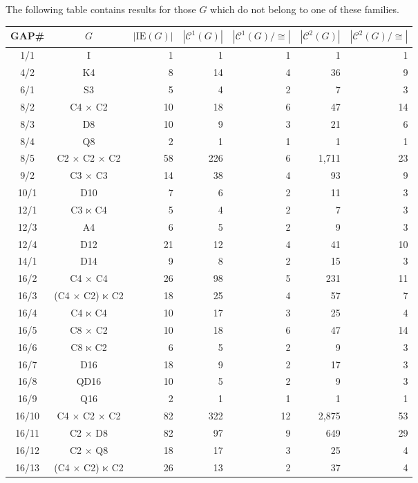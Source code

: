 \documentclass[a4paper,11pt]{article}
\theoremstyle{plain}
\theoremstyle{definition}
\begin{document}
The following table contains results for those $G$ which do not belong 
to one of these families. 
\begin{longtable}{ccrrrrr}
	\hline\hline
	{\textsf{GAP}}\# 
	    & $G$ 
	        & $|\mathrm{IE}(G)|$ 
	            & $|\mathcal{C}^1(G)|$ 
	                & $|\mathcal{C}^1(G)/\cong |$ 
	                    & $|\mathcal{C}^{2}(G)|$ 
	                        & $|\mathcal{C}^{2}(G)/\cong |$  \\ 
	\hline
	1/1 & I & 1 & 1 & 1 & 1 & 1 \\ 
	4/2 & K4 & 8 & 14 & 4 & 36 & 9 \\ 
	6/1 & S3 & 5 & 4 & 2 & 7 & 3 \\ 
	8/2 & C4 $\times$ C2 & 10 & 18 & 6 & 47 & 14 \\ 
	8/3 & D8 & 10 & 9 & 3 & 21 & 6 \\ 
	8/4 & Q8 & 2 & 1 & 1 & 1 & 1 \\ 
	8/5 & C2 $\times$ C2 $\times$ C2 & 58 & 226 & 6 & 1,711 & 23 \\ 
	9/2 & C3 $\times$ C3 & 14 & 38 & 4 & 93 & 9 \\ 
	10/1 & D10 & 7 & 6 & 2 & 11 & 3 \\ 
	12/1 & C3 $\ltimes$ C4 & 5 & 4 & 2 & 7 & 3 \\ 
	12/3 & A4 & 6 & 5 & 2 & 9 & 3 \\ 
	12/4 & D12 & 21 & 12 & 4 & 41 & 10 \\ 
	14/1 & D14 & 9 & 8 & 2 & 15 & 3 \\ 
	16/2 & C4 $\times$ C4 & 26 & 98 & 5 & 231 & 11 \\ 
	16/3 & (C4 $\times$ C2) $\ltimes$ C2 & 18 & 25 & 4 & 57 & 7 \\ 
	16/4 & C4 $\ltimes$ C4 & 10 & 17 & 3 & 25 & 4 \\ 
	16/5 & C8 $\times$ C2 & 10 & 18 & 6 & 47 & 14 \\ 
	16/6 & C8 $\ltimes$ C2 & 6 & 5 & 2 & 9 & 3 \\ 
	16/7 & D16 & 18 & 9 & 2 & 17 & 3 \\ 
	16/8 & QD16 & 10 & 5 & 2 & 9 & 3 \\ 
	16/9 & Q16 & 2 & 1 & 1 & 1 & 1 \\ 
	16/10 & C4 $\times$ C2 $\times$ C2 & 82 & 322 & 12 & 2,875 & 53 \\ 
	16/11 & C2 $\times$ D8 & 82 & 97 & 9 & 649 & 29 \\ 
	16/12 & C2 $\times$ Q8 & 18 & 17 & 3 & 25 & 4 \\ 
	16/13 & (C4 $\times$ C2) $\ltimes$ C2 & 26 & 13 & 2 & 37 & 4 \\ 

\end{longtable}
\end{document}
